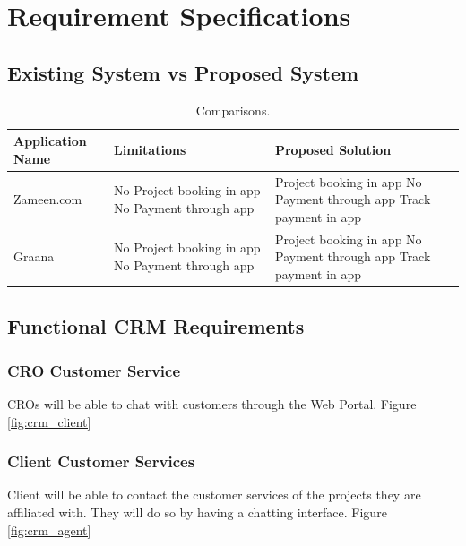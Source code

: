 \chapter{Requirement Specifications} \label{chap:reqs}


\section*{}
\section{Existing System vs Proposed System}

\begin{table}[h]
	\caption{\label{Related Systems} Comparisons.}
	\begin{tabular}{ |p{3cm}|p{6cm}|p{6cm}| }
		\hline
		\textbf{Application Name} & \textbf{Limitations}                                                                 & \textbf{Proposed Solution} \\
		\hline
		Zameen.com
		                          & No Project booking in app \newline No Payment through app
		                          & Project booking in app \newline No Payment through app \newline Track payment in app                              \\
		\hline
		Graana
		                          & No Project booking in app No \newline Payment through app
		                          & Project booking in app No \newline Payment through app \newline Track payment in app                              \\
		\hline
	\end{tabular}
\end{table}

\section{Functional CRM Requirements}
\subsection{CRO Customer Service}
CROs will be able to chat with customers through the Web Portal. Figure \ref{fig:crm_client}
\subsection{Client Customer Services}
Client will be able to contact the customer services of the projects they are affiliated with. They will do so by having a chatting interface. Figure \ref{fig:crm_agent}

